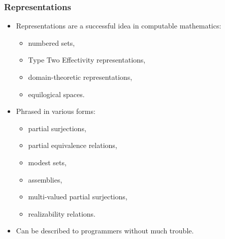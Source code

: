 \documentclass[t,handout]{beamer}
\begin{document}
\begin{frame}
  \frametitle{Representations}

  \begin{itemize}
  \item Representations are a successful idea in computable
    mathematics:
    \begin{itemize}[<.->]
    \item numbered sets,
    \item Type Two Effectivity representations,
    \item domain-theoretic representations,
    \item equilogical spaces.
    \end{itemize}
  \item Phrased in various forms:
    \begin{itemize}[<.->]
    \item partial surjections,
    \item partial equivalence relations,
    \item modest sets,
    \item assemblies,
    \item multi-valued partial surjections,
    \item realizability relations.
    \end{itemize}
  \item Can be described to programmers without much trouble.
  \end{itemize}
\end{frame}
\end{document}
